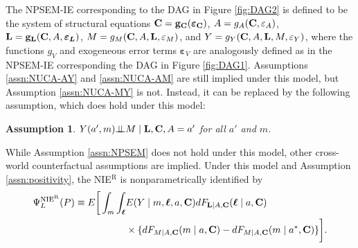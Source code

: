 \documentclass[12pt]{article}
\newtheorem{assumption}{Assumption}
\def\ci{\mbox{\ensuremath{\perp\!\!\!\perp}}}
\begin{document}
The NPSEM-IE corresponding to the DAG in Figure \ref{fig:DAG2} is defined to be the system of structural equations ${\bf C} = {\bf g_C}(\boldsymbol{\varepsilon}_{\bf C})$, $A = g_A({\bf C}, \varepsilon_A)$, ${\bf L} = {\bf g_L}({\bf C}, A, \boldsymbol{\varepsilon_L})$, $M = g_M({\bf C}, A, {\bf L}, \varepsilon_M)$, and $Y = g_Y({\bf C}, A, {\bf L}, M, \varepsilon_Y)$, where the functions $g_{V}$ and exogeneous error terms $\boldsymbol{\varepsilon}_V$ are analogously defined as in the NPSEM-IE corresponding the DAG in Figure \ref{fig:DAG1}. %
Assumptions \ref{assn:NUCA-AY} and \ref{assn:NUCA-AM} are still implied under this model, but Assumption \ref{assn:NUCA-MY} is not. Instead, it can be replaced by the following assumption, which does hold under this model:
\begin{assumption}%
    \label{assn:NUCA-MY-L}
    $Y(a',m)\ci M\mid {\bf L}, {\bf C},A=a'$ for all $a'$ and $m$.
\end{assumption}
While Assumption \ref{assn:NPSEM} does not hold under this model, other cross-world counterfactual assumptions are implied. Under this model %
and Assumption \ref{assn:positivity}, the NIE$^{\mathrm{R}}$ is nonparametrically identified by
\begin{align*}
    \Psi^{\text{NIE}^{\text{R}}}_{L}(P)\equiv E\bigg[\int_m \int_{\boldsymbol{\ell}} & E(Y\mid m,\boldsymbol{\ell},a,{\bf C})dF_{{\bf L}\mid A, {\bf C}}(\boldsymbol{\ell}\mid a, {\bf C})\\
    &\times \{dF_{M\mid A,{\bf C}}(m\mid a,{\bf C}) - dF_{M\mid A,{\bf C}}(m\mid a^*,{\bf C})\}\bigg].
\end{align*}
\end{document}
